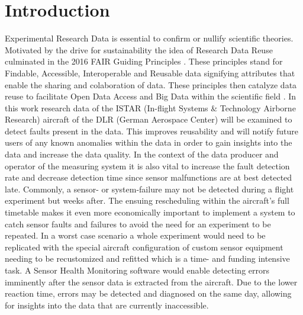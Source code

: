 
\chapter{Introduction \label{ch1-intro}}
Experimental Research Data is essential to confirm or nullify scientific theories. Motivated by the drive for sustainability the idea of Research Data Reuse culminated in the 2016 FAIR Guiding Principles \cite{wilkinson_fair_2016}. These principles stand for Findable, Accessible, Interoperable and Reusable data signifying attributes that enable the sharing and colaboration of data. These principles then catalyze data reuse to facilitate Open Data Access and Big Data within the scientific field \cite{hodson_fair_2018}. In this work research data of the ISTAR (In-flight Systems \& Technology Airborne Research) aircraft of the DLR (German Aerospace Center) will be examined to detect faults present in the data. This improves reusability and will notify future users of any known anomalies within the data in order to gain insights into the data and increase the data quality. In the context of the data producer and operator of the measuring system it is also vital to increase the fault detection rate and decrease detection time since sensor malfunctions are at best detected late. Commonly, a sensor- or system-failure may not be detected during a flight experiment but weeks after. The ensuing rescheduling within the aircraft's full timetable makes it even more economically important to implement a system to catch sensor faults and failures to avoid the need for an experiment to be repeated. In a worst case scenario a whole experiment would need to be replicated with the special aircraft configuration of custom sensor equipment needing to be recustomized and refitted which is a time- and funding intensive task.
A Sensor Health Monitoring software would enable detecting errors imminently after the sensor data is extracted from the aircraft. Due to the lower reaction time, errors may be detected and diagnosed on the same day, allowing for insights into the data that are currently inaccessible.

